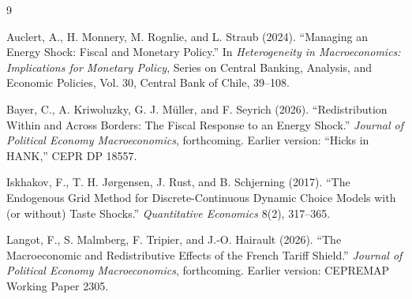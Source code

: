 \documentclass[11pt,a4paper]{article}
\begin{document}
\begin{thebibliography}{9}

Auclert, A., H. Monnery, M. Rognlie, and L. Straub (2024).
``Managing an Energy Shock: Fiscal and Monetary Policy.''
In \emph{Heterogeneity in Macroeconomics: Implications for Monetary Policy},
Series on Central Banking, Analysis, and Economic Policies, Vol. 30,
Central Bank of Chile, 39--108.

Bayer, C., A. Kriwoluzky, G. J. M\"uller, and F. Seyrich (2026).
``Redistribution Within and Across Borders: The Fiscal Response to an Energy
Shock.'' \emph{Journal of Political Economy Macroeconomics}, forthcoming.
Earlier version: ``Hicks in HANK,'' CEPR DP 18557.

Iskhakov, F., T. H. J{\o}rgensen, J. Rust, and B. Schjerning (2017).
``The Endogenous Grid Method for Discrete-Continuous Dynamic Choice Models with
(or without) Taste Shocks.'' \emph{Quantitative Economics} 8(2), 317--365.

Langot, F., S. Malmberg, F. Tripier, and J.-O. Hairault (2026).
``The Macroeconomic and Redistributive Effects of the French Tariff Shield.''
\emph{Journal of Political Economy Macroeconomics}, forthcoming.
Earlier version: CEPREMAP Working Paper 2305.

\end{thebibliography}
\end{document}
